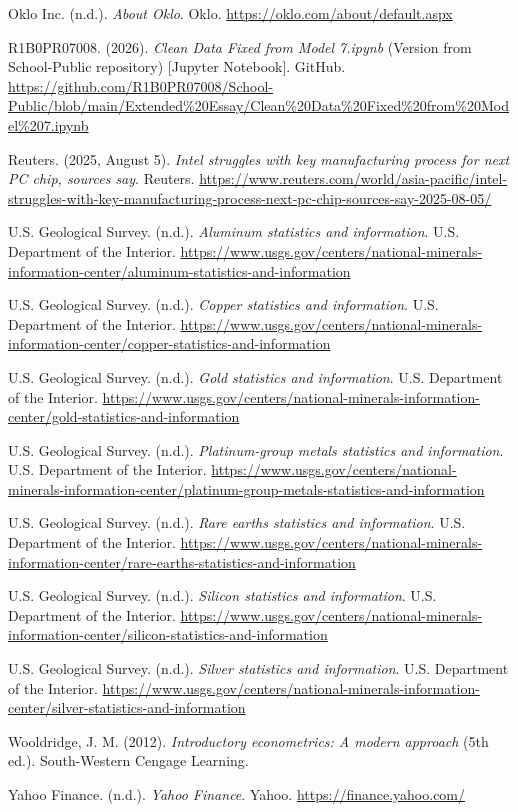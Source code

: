 \documentclass[12pt]{article}
\begin{document}
Oklo Inc. (n.d.). \textit{About Oklo}. Oklo. \url{https://oklo.com/about/default.aspx}

R1B0PR07008. (2026). \textit{Clean Data Fixed from Model 7.ipynb} (Version from School-Public repository) [Jupyter Notebook]. GitHub. \url{https://github.com/R1B0PR07008/School-Public/blob/main/Extended%20Essay/Clean%20Data%20Fixed%20from%20Model%207.ipynb}

Reuters. (2025, August 5). \textit{Intel struggles with key manufacturing process for next PC chip, sources say}. Reuters. \url{https://www.reuters.com/world/asia-pacific/intel-struggles-with-key-manufacturing-process-next-pc-chip-sources-say-2025-08-05/}

U.S. Geological Survey. (n.d.). \textit{Aluminum statistics and information}. U.S. Department of the Interior. \url{https://www.usgs.gov/centers/national-minerals-information-center/aluminum-statistics-and-information}

U.S. Geological Survey. (n.d.). \textit{Copper statistics and information}. U.S. Department of the Interior. \url{https://www.usgs.gov/centers/national-minerals-information-center/copper-statistics-and-information}

U.S. Geological Survey. (n.d.). \textit{Gold statistics and information}. U.S. Department of the Interior. \url{https://www.usgs.gov/centers/national-minerals-information-center/gold-statistics-and-information}

U.S. Geological Survey. (n.d.). \textit{Platinum-group metals statistics and information}. U.S. Department of the Interior. \url{https://www.usgs.gov/centers/national-minerals-information-center/platinum-group-metals-statistics-and-information}

U.S. Geological Survey. (n.d.). \textit{Rare earths statistics and information}. U.S. Department of the Interior. \url{https://www.usgs.gov/centers/national-minerals-information-center/rare-earths-statistics-and-information}

U.S. Geological Survey. (n.d.). \textit{Silicon statistics and information}. U.S. Department of the Interior. \url{https://www.usgs.gov/centers/national-minerals-information-center/silicon-statistics-and-information}

U.S. Geological Survey. (n.d.). \textit{Silver statistics and information}. U.S. Department of the Interior. \url{https://www.usgs.gov/centers/national-minerals-information-center/silver-statistics-and-information}

Wooldridge, J. M. (2012). \textit{Introductory econometrics: A modern approach} (5th ed.). South-Western Cengage Learning.

Yahoo Finance. (n.d.). \textit{Yahoo Finance}. Yahoo. \url{https://finance.yahoo.com/}
    
    
\end{document}
